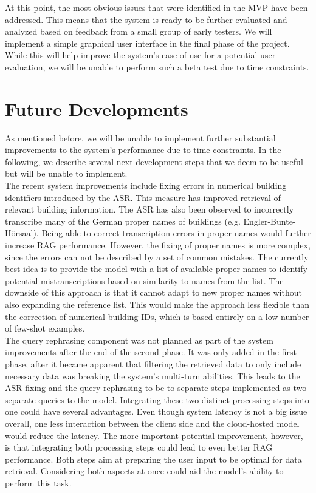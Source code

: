 \documentclass{article}
\begin{document}
At this point, the most obvious issues that were identified in the MVP have been addressed. This means that the system is ready to be further evaluated and analyzed based on feedback from a small group of early testers. We will implement a simple graphical user interface in the final phase of the project. While this will help improve the system's ease of use for a potential user evaluation, we will be unable to perform such a beta test due to time constraints.

\section{Future Developments}
As mentioned before, we will be unable to implement further substantial improvements to the system's performance due to time constraints. In the following, we describe several next development steps that we deem to be useful but will be unable to implement.\\

The recent system improvements include fixing errors in numerical building identifiers introduced by the ASR. This measure has improved retrieval of relevant building information. The ASR has also been observed to incorrectly transcribe many of the German proper names of buildings (e.g. Engler-Bunte-Hörsaal). Being able to correct transcription errors in proper names would further increase RAG performance. However, the fixing of proper names is more complex, since the errors can not be described by a set of common mistakes. The currently best idea is to provide the model with a list of available proper names to identify potential mistranscriptions based on similarity to names from the list. The downside of this approach is that it cannot adapt to new proper names without also expanding the reference list. This would make the approach less flexible than the correction of numerical building IDs, which is based entirely on a low number of few-shot examples.\\

The query rephrasing component was not planned as part of the system improvements after the end of the second phase. It was only added in the first phase, after it became apparent that filtering the retrieved data to only include necessary data was breaking the system's multi-turn abilities. This leads to the ASR fixing and the query rephrasing to be to separate steps implemented as two separate queries to the model. Integrating these two distinct processing steps into one could have several advantages. Even though system latency is not a big issue overall, one less interaction between the client side and the cloud-hosted model would reduce the latency. The more important potential improvement, however, is that integrating both processing steps could lead to even better RAG performance. Both steps aim at preparing the user input to be optimal for data retrieval. Considering both aspects at once could aid the model's ability to perform this task.\\
\end{document}
